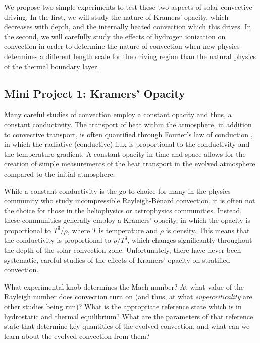 \documentclass[aasms,12pt]{article}
\newcommand{\RB}{Rayleigh-B\'{e}nard }
\begin{document}
We propose two simple experiments to test these two aspects of solar convective driving.  In the first,
we will study the nature of Kramers' opacity, which decreases with depth, and the internally heated
convection which this drives.  In the second, we will carefully study the effects of hydrogen ionization
on convection in order to determine the nature of convection when new physics determines a different length
scale for the driving region than the natural physics of the thermal boundary layer.

\subsection{Mini Project 1: Kramers' Opacity}
Many careful studies of convection employ a constant opacity and thus, a constant conductivity.
The transport of heat within the atmosphere, in addition to convective transport, is often 
quantified through Fourier's law of conduction \citep{lecoanet&all2014}, in which the radiative
(conductive) flux is proportional to the conductivity and the temperature gradient.  
A constant opacity in time and space allows for the creation of simple measurements of the
heat transport in the evolved atmosphere compared to the initial atmosphere.  

While a constant
conductivity is the go-to choice for many in the physics community who study incompressible
\RB convection, it is often not the choice for those in the heliophysics or astrophysics
communities.  Instead, these communities generally employ a Kramers' opacity, in which the
opacity is proportional to $T^3/\rho$, where $T$ is temperature and $\rho$ is density.
This means that the conductivity is proportional to $\rho/T^3$, which changes significantly
throughout the depth of the solar convection zone.  Unfortunately, there have never been
systematic, careful studies of the effects of Kramers' opacity on stratified convection.

What experimental knob determines the Mach number?  At what value of the Rayleigh number
does convection turn on (and thus, at what \emph{supercriticality} are other studies
being run)?  What is the appropriate reference state which is in hydrostatic and thermal
equilibrium?  What are the parameters of that reference state that determine key quantities
of the evolved convection, and what can we learn about the evolved convection from them?
\end{document}
